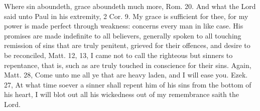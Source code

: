 {Where sin aboundeth, grace aboundeth much more, Rom.  20. And what
the Lord said unto Paul in his extremity, 2 Cor.  9. My grace is
sufficient for thee, for my power is made perfect through weakness:
concerns every man in like case. His promises are made indefinite to
all believers, generally spoken to all touching remission of sins that
are truly penitent, grieved for their offences, and desire to be
reconciled, Matt.  12, 13, I came not to call the righteous but
sinners to repentance, that is, such as are truly touched in conscience
for their sins. Again, Matt.  28, Come unto me all ye that are heavy
laden, and I will ease you. Ezek.  27, At what time soever a
sinner shall repent him of his sins from the bottom of his heart, I
will blot out all his wickedness out of my remembrance saith the Lord.

}
